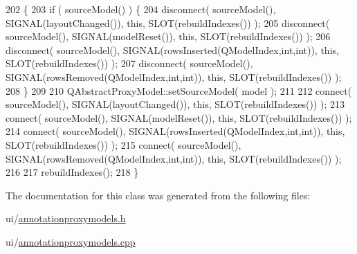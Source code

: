\begin{DoxyCode}
202 \{
203   \textcolor{keywordflow}{if} ( sourceModel() ) \{
204     disconnect( sourceModel(), SIGNAL(layoutChanged()), \textcolor{keyword}{this}, SLOT(rebuildIndexes()) );
205     disconnect( sourceModel(), SIGNAL(modelReset()), \textcolor{keyword}{this}, SLOT(rebuildIndexes()) );
206     disconnect( sourceModel(), SIGNAL(rowsInserted(QModelIndex,\textcolor{keywordtype}{int},\textcolor{keywordtype}{int})), \textcolor{keyword}{this}, SLOT(rebuildIndexes()) );
207     disconnect( sourceModel(), SIGNAL(rowsRemoved(QModelIndex,\textcolor{keywordtype}{int},\textcolor{keywordtype}{int})), \textcolor{keyword}{this}, SLOT(rebuildIndexes()) );
208   \}
209 
210   QAbstractProxyModel::setSourceModel( model );
211 
212   connect( sourceModel(), SIGNAL(layoutChanged()), \textcolor{keyword}{this}, SLOT(rebuildIndexes()) );
213   connect( sourceModel(), SIGNAL(modelReset()), \textcolor{keyword}{this}, SLOT(rebuildIndexes()) );
214   connect( sourceModel(), SIGNAL(rowsInserted(QModelIndex,\textcolor{keywordtype}{int},\textcolor{keywordtype}{int})), \textcolor{keyword}{this}, SLOT(rebuildIndexes()) );
215   connect( sourceModel(), SIGNAL(rowsRemoved(QModelIndex,\textcolor{keywordtype}{int},\textcolor{keywordtype}{int})), \textcolor{keyword}{this}, SLOT(rebuildIndexes()) );
216 
217   rebuildIndexes();
218 \}
\end{DoxyCode}


The documentation for this class was generated from the following files\+:\begin{DoxyCompactItemize}
\item 
ui/\hyperlink{annotationproxymodels_8h}{annotationproxymodels.\+h}\item 
ui/\hyperlink{annotationproxymodels_8cpp}{annotationproxymodels.\+cpp}\end{DoxyCompactItemize}
